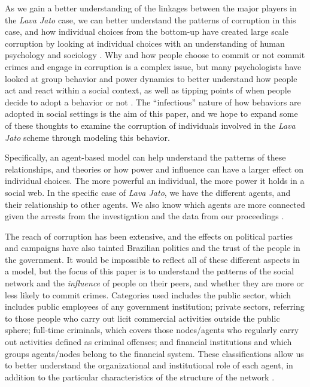 \documentclass[letterpaper, 11pt]{article}
\begin{document}
As we gain a better understanding of the linkages between the major players in the \emph{Lava Jato} case, we can better understand the patterns of corruption in this case, and how individual choices from the bottom-up have created large scale corruption by looking at individual choices with an understanding of human psychology and sociology \citep{besley2006}. Why and how people choose to commit or not commit crimes and engage in corruption is a complex issue, but many psychologists \citep{milgram1963,raven1958} have looked at group behavior and power dynamics to better understand how people act and react within a social context, as well as tipping points of when people decide to adopt a behavior or not \citep{centola2005}. The “infectious” nature of how behaviors are adopted in social settings is the aim of this paper, and we hope to expand some of these thoughts to examine the corruption of individuals involved in the \emph{Lava Jato} scheme through modeling this behavior.

Specifically, an agent-based model can help understand the patterns of these relationships, and theories or how power and influence can have a larger effect on individual choices. The more powerful an individual, the more power it holds in a social web. In the specific case of \emph{Lava Jato}, we have the different agents, and their relationship to other agents. We also know which agents are more connected given the arrests from the investigation and the data from our proceedings \citep{garay18}.

The reach of corruption has been extensive, and the effects on political parties and campaigns have also tainted Brazilian politics and the trust of the people in the government. It would be impossible to reflect all of these different aspects in a model, but the focus of this paper is to understand the patterns of the social network and the \emph{influence} \citep{centola2005} of people on their peers, and whether they are more or less likely to commit crimes. Categories used  includes the public sector, which includes public employees of any government institution; private sectors, referring to those people who carry out licit commercial activities outside the public sphere; full-time criminals, which covers those nodes/agents who regularly carry out activities defined as criminal offenses; and financial institutions and which groups agents/nodes belong to the financial system. These classifications allow us to better understand the organizational and institutional role of each agent, in addition to the particular characteristics of the structure of the network \citep{garay18}.
\end{document}
